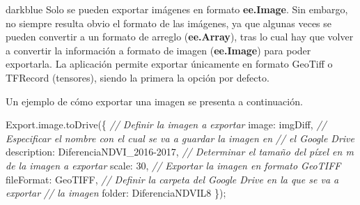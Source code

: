 \documentclass[
  12pt,
  letterpaper,
  twoside]{book}
\newenvironment{Shaded}{\begin{snugshade}}{\end{snugshade}}
\newcommand{\AttributeTok}[1]{\textcolor[rgb]{0.48,0.12,0.64}{#1}}
\newcommand{\CommentTok}[1]{\textcolor[rgb]{0.24,0.58,0.00}{\textit{#1}}}
\newcommand{\DataTypeTok}[1]{\textcolor[rgb]{0.00,0.00,0.00}{#1}}
\newcommand{\DecValTok}[1]{\textcolor[rgb]{0.28,0.53,0.93}{#1}}
\newcommand{\FunctionTok}[1]{\textcolor[rgb]{0.48,0.12,0.64}{#1}}
\newcommand{\NormalTok}[1]{#1}
\newcommand{\OperatorTok}[1]{\textcolor[rgb]{0.00,0.00,0.00}{#1}}
\newcommand{\StringTok}[1]{\textcolor[rgb]{0.87,0.29,0.22}{#1}}
\newcommand\boldpurple[1]{\textcolor{darkpurple}{\textbf{#1}}}
\begin{document}
\begin{bluebox2}

\begin{awesomeblock}{5pt}{\faLightbulb}{darkblue}
Solo se pueden exportar imágenes en formato \boldpurple{ee.Image}. Sin embargo, no siempre resulta obvio el formato de las imágenes, ya que algunas veces se pueden convertir a un formato de arreglo (\boldpurple{ee.Array}), tras lo cual hay que volver a convertir la información a formato de imagen (\boldpurple{ee.Image}) para poder exportarla. La aplicación permite exportar únicamente en formato GeoTiff o TFRecord (tensores), siendo la primera la opción por defecto.

\end{awesomeblock}

\end{bluebox2}

Un ejemplo de cómo exportar una imagen se presenta a continuación.

\begin{Shaded}
\begin{Highlighting}[]
\NormalTok{Export}\OperatorTok{.}\AttributeTok{image}\OperatorTok{.}\FunctionTok{toDrive}\NormalTok{(\{}
  \CommentTok{// Definir la imagen a exportar}
  \DataTypeTok{image}\OperatorTok{:}\NormalTok{ imgDiff}\OperatorTok{,}
  \CommentTok{// Especificar el nombre con el cual se va a guardar la imagen en}
  \CommentTok{// el Google Drive}
  \DataTypeTok{description}\OperatorTok{:} \StringTok{\textquotesingle{}DiferenciaNDVI\_2016{-}2017\textquotesingle{}}\OperatorTok{,}
  \CommentTok{// Determinar el tamaño del píxel en m de la imagen a exportar}
  \DataTypeTok{scale}\OperatorTok{:} \DecValTok{30}\OperatorTok{,}
  \CommentTok{// Exportar la imagen en formato GeoTIFF}
  \DataTypeTok{fileFormat}\OperatorTok{:} \StringTok{\textquotesingle{}GeoTIFF\textquotesingle{}}\OperatorTok{,}
  \CommentTok{// Definir la carpeta del Google Drive en la que se va a exportar}
  \CommentTok{// la imagen}
  \DataTypeTok{folder}\OperatorTok{:} \StringTok{\textquotesingle{}DiferenciaNDVIL8\textquotesingle{}}
\NormalTok{\})}\OperatorTok{;} 
\end{Highlighting}
\end{Shaded}
\end{document}
